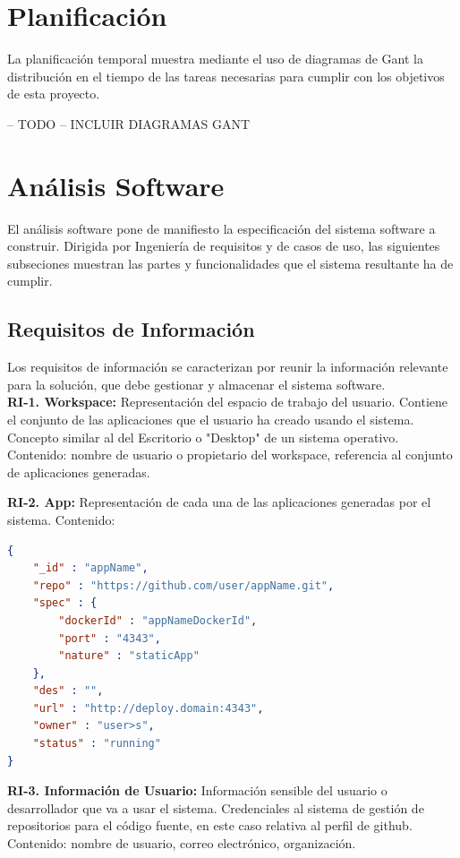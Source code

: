 \documentclass[a4paper,11pt]{book}
\begin{document}
\section{Planificación}

La planificación temporal muestra mediante el uso de diagramas de Gant la distribución en el tiempo de las tareas necesarias para cumplir con los objetivos de esta proyecto. 

--  TODO -- INCLUIR DIAGRAMAS GANT


\section{Análisis Software}

El análisis software pone de manifiesto la especificación del sistema software a construir. Dirigida por Ingeniería de requisitos y de casos de uso, las siguientes subseciones muestran las partes y funcionalidades que el sistema resultante ha de cumplir. 

\subsection{Requisitos de Información }
Los requisitos de información se caracterizan por reunir la información relevante para la solución, que debe gestionar y almacenar el sistema software.\\

\textbf{RI-1. Workspace:} Representación del espacio de trabajo del usuario. Contiene el conjunto de las aplicaciones que el usuario ha creado usando el sistema. Concepto similar al del Escritorio o "Desktop" de un sistema operativo. 
Contenido: nombre de usuario o propietario del workspace, referencia al conjunto de aplicaciones generadas.


\textbf{RI-2. App:} Representación de cada una de las aplicaciones generadas por el sistema. 
Contenido:
\begin{lstlisting}[language=json,firstnumber=1]
{
    "_id" : "appName",
    "repo" : "https://github.com/user/appName.git",
    "spec" : {
        "dockerId" : "appNameDockerId",
        "port" : "4343",
        "nature" : "staticApp"
    },
    "des" : "",
    "url" : "http://deploy.domain:4343",
    "owner" : "user>s",
    "status" : "running"
}
\end{lstlisting}

\textbf{RI-3. Información de Usuario:} Información sensible del usuario o desarrollador que va a usar el sistema. Credenciales al sistema de gestión de repositorios para el código fuente, en este caso relativa al perfil de github. 
Contenido: nombre de usuario, correo electrónico, organización. \\
\end{document}
